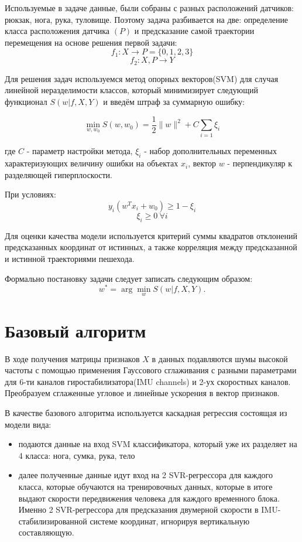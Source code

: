 \documentclass{article}
\begin{document}
Используемые в задаче данные, были собраны с разных расположений датчиков: рюкзак, нога, рука, туловище. Поэтому задача разбивается на две: определение класса расположения датчика $(P)$ и предсказание самой траектории перемещения на основе решения первой задачи:
\[f_1: X \to P = \{0, 1, 2, 3\}\]
\[f_2: X,P \to Y\]

Для решения задач используемся метод опорных векторов(SVM) для случая линейной неразделимости классов, который минимизирует следующий функционал $S(w|f,X,Y)$ и введём штраф за суммарную ошибку:

\[\min_{w, w_0}S(w, w_0) = \frac{1}{2}\|w\|^2+C\sum_{i=1}\xi_i\] 

где $C$ - параметр настройки метода,  $\xi_i$ - набор дополнительных переменных характеризующих величину ошибки на объектах $x_i$, вектор $w$ - перпендикуляр к разделяющей гиперплоскости.

При условиях:
\[y_i(w^Tx_i+w_0)\geq 1-\xi_i\]
\[\xi_i \geq 0~\forall i\]

Для оценки качества модели используется критерий суммы квадратов отклонений предсказанных координат от истинных, а также корреляция между предсказанной и истинной траекториями пешехода.

Формально постановку задачи следует записать следующим образом:
\[w^* = \arg\min_{w}S(w|f, X, Y).\]

\section{Базовый алгоритм}
В ходе получения матрицы признаков $X$ в данных подавляются шумы высокой частоты с помощью применения Гауссового сглаживания с разными параметрами для 6-ти каналов гиростабилизатора(IMU channels) и 2-ух скоростных каналов. Преобразуем сглаженные угловое и линейные ускорения в вектор признаков.

В качестве базового алгоритма используется каскадная регрессия состоящая из модели вида:
\begin{itemize}

\item подаются данные на вход SVM классификатора, который уже их разделяет на 4 класса: нога, сумка, рука, тело
\item далее полученные данные идут вход на 2 SVR-регрессора для каждого класса, которые обучаются на тренировочных данных, которые в итоге выдают скорости передвижения человека для каждого временного блока. Именно 2 SVR-регрессора для предсказания двумерной скорости в IMU-стабилизированной системе координат, игнорируя вертикальную составляющую.
\end{itemize}
\end{document}
